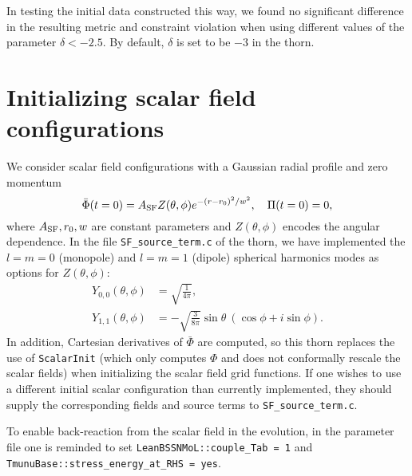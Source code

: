 In testing the initial data constructed this way, we found no significant difference in
the resulting metric and constraint violation when using different values of
the parameter $\delta < -2.5$.
By default, $\delta$ is set to be $-3$ in the thorn.

\section{Initializing scalar field configurations}
We consider scalar field configurations with a Gaussian radial profile and zero momentum
\begin{equation}
    \bar{\Phi}(t=0) = A_{\rm SF} Z(\theta, \phi) e^{-(r-r_0)^2/w^2},
    \quad
    \Pi(t=0) = 0,
\end{equation}
where $A_{\rm SF}, r_0, w$ are constant parameters
and $Z(\theta, \phi)$ encodes the angular dependence.
In the file \texttt{SF\_source\_term.c} of the thorn, we have implemented
the $l=m=0$ (monopole) and $l=m=1$ (dipole) spherical harmonics modes
as options for $Z(\theta, \phi)$:
\begin{align}
    Y_{0,0}(\theta, \phi)
    &= \sqrt{\frac{1}{4\pi}},
    \\
    Y_{1,1}(\theta, \phi)
    &= -\sqrt{\frac{3}{8\pi}} \sin\theta\ (\cos\phi + i \sin\phi).
\end{align}
In addition, Cartesian derivatives of $\bar{\Phi}$ are computed,
so this thorn replaces the use of \texttt{ScalarInit}
(which only computes $\Phi$ and does not conformally rescale the scalar fields)
when initializing the scalar field grid functions.
If one wishes to use a different initial scalar configuration than currently implemented,
they should supply the corresponding fields and source terms to \texttt{SF\_source\_term.c}.

To enable back-reaction from the scalar field in the evolution, in the parameter file one
is reminded to set \texttt{LeanBSSNMoL::couple\_Tab = 1} and
\texttt{TmunuBase::stress\_energy\_at\_RHS = yes}.

